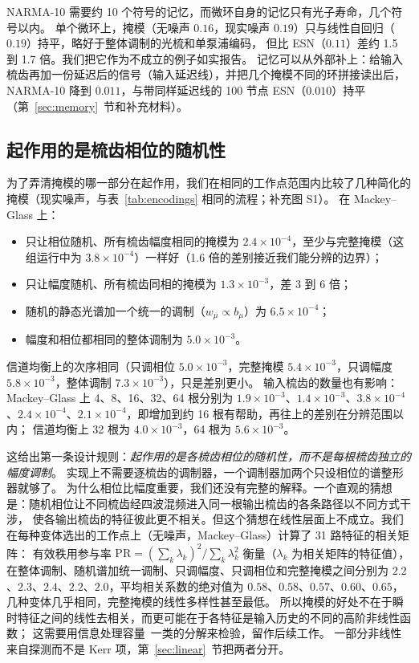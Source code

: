 NARMA-10 需要约 10 个符号的记忆，而微环自身的记忆只有光子寿命，几个符号以内。
单个微环上，掩模（无噪声 $0.16$，现实噪声 $0.19$）只与线性自回归（$0.19$）持平，略好于整体调制的光梳和单泵浦编码，
但比 ESN（$0.11$）差约 1.5 到 1.7 倍。我们把它作为不成立的例子如实报告。
记忆可以从外部补上：给输入梳齿再加一份延迟后的信号（输入延迟线），并把几个掩模不同的环拼接读出后，
NARMA-10 降到 $0.011$，与带同样延迟线的 100 节点 ESN（$0.010$）持平（第~\ref{sec:memory}~节和补充材料）。

\subsection{起作用的是梳齿相位的随机性}\label{sec:ablation}

为了弄清掩模的哪一部分在起作用，我们在相同的工作点范围内比较了几种简化的掩模（现实噪声，与表~\ref{tab:encodings} 相同的流程；补充图 S1）。
在 Mackey--Glass 上：
\begin{itemize}
\item 只让相位随机、所有梳齿幅度相同的掩模为 $2.4\times10^{-4}$，至少与完整掩模（这组运行中为 $3.8\times10^{-4}$）一样好（1.6 倍的差别接近我们能分辨的边界）；
\item 只让幅度随机、所有梳齿同相的掩模为 $1.3\times10^{-3}$，差 3 到 6 倍；
\item 随机的静态光谱加一个统一的调制（$w_\mu\propto b_\mu$）为 $6.5\times10^{-4}$；
\item 幅度和相位都相同的整体调制为 $5.0\times10^{-3}$。
\end{itemize}
信道均衡上的次序相同（只调相位 $5.0\times10^{-3}$，完整掩模 $5.4\times10^{-3}$，只调幅度 $5.8\times10^{-3}$，整体调制 $7.3\times10^{-3}$），只是差别更小。
输入梳齿的数量也有影响：Mackey--Glass 上 4、8、16、32、64 根分别为
$1.9\times10^{-3}$、$1.4\times10^{-3}$、$3.8\times10^{-4}$、$2.4\times10^{-4}$、$2.1\times10^{-4}$，即增加到约 16 根有帮助，再往上的差别在分辨范围以内；
信道均衡上 32 根为 $4.0\times10^{-3}$，64 根为 $5.6\times10^{-3}$。

这给出第一条设计规则：\emph{起作用的是各梳齿相位的随机性，而不是每根梳齿独立的幅度调制}。
实现上不需要逐梳齿的调制器，一个调制器加两个只设相位的谱整形器就够了。
为什么相位比幅度重要，我们还没有完整的解释。一个直观的猜想是：随机相位让不同梳齿经四波混频进入同一根输出梳齿的各条路径以不同方式干涉，
使各输出梳齿的特征彼此更不相关。但这个猜想在线性层面上不成立。我们在每种变体选出的工作点上（无噪声，Mackey--Glass）计算了 31 路特征的相关矩阵：
有效秩用参与率 $\mathrm{PR}=(\sum_k\lambda_k)^2/\sum_k\lambda_k^2$ 衡量（$\lambda_k$ 为相关矩阵的特征值），在整体调制、随机谱加统一调制、只调幅度、只调相位和完整掩模之间分别为
$2.2$、$2.3$、$2.4$、$2.2$、$2.0$，平均相关系数的绝对值为 $0.58$、$0.58$、$0.57$、$0.60$、$0.65$，几种变体几乎相同，完整掩模的线性多样性甚至最低。
所以掩模的好处不在于瞬时特征之间的线性去相关，而更可能在于各特征是输入历史的不同的高阶非线性函数；
这需要用信息处理容量~\cite{dambre2012}一类的分解来检验，留作后续工作。
一部分非线性来自探测而不是 Kerr 项，第~\ref{sec:linear}~节把两者分开。

